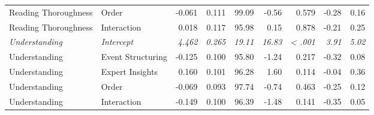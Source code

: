 \begin{longtable}{l l r r r r r r r}
  Reading Thoroughness & Order & -0.061 & 0.111 & 99.09 & -0.56 & 0.579 & -0.28 & 0.16\\*
  Reading Thoroughness & Interaction & 0.018 & 0.117 & 95.98 & 0.15 & 0.878 & -0.21 & 0.25\\
  \addlinespace
  \textit{Understanding} & \textit{Intercept} & \textit{4.462} & \textit{0.265} & \textit{19.11} & \textit{16.83} & \textit{< .001} & \textit{3.91} & \textit{5.02}\\*
  Understanding & Event Structuring & -0.125 & 0.100 & 95.80 & -1.24 & 0.217 & -0.32 & 0.08\\*
  Understanding & Expert Insights & 0.160 & 0.101 & 96.28 & 1.60 & 0.114 & -0.04 & 0.36\\*
  Understanding & Order & -0.069 & 0.093 & 97.74 & -0.74 & 0.463 & -0.25 & 0.12\\*
  Understanding & Interaction & -0.149 & 0.100 & 96.39 & -1.48 & 0.141 & -0.35 & 0.05\\
\end{longtable}
\normalsize

